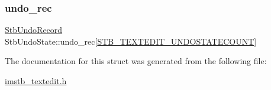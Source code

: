 \mbox{\label{struct_stb_undo_state_a8cb07be8f304d1620b50bd024709023f}} 
\subsubsection{\texorpdfstring{undo\+\_\+rec}{undo\_rec}}
{\footnotesize\ttfamily \mbox{\hyperlink{struct_stb_undo_record}{Stb\+Undo\+Record}} Stb\+Undo\+State\+::undo\+\_\+rec\mbox{[}\mbox{\hyperlink{imstb__textedit_8h_afa79483143df87a1497010712b3dfaf9}{S\+T\+B\+\_\+\+T\+E\+X\+T\+E\+D\+I\+T\+\_\+\+U\+N\+D\+O\+S\+T\+A\+T\+E\+C\+O\+U\+NT}}\mbox{]}}



The documentation for this struct was generated from the following file\+:\begin{DoxyCompactItemize}
\item 
\mbox{\hyperlink{imstb__textedit_8h}{imstb\+\_\+textedit.\+h}}\end{DoxyCompactItemize}
